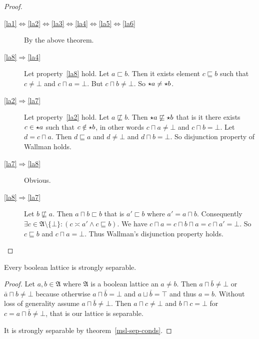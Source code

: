 \begin{proof}
~
\begin{description}
\item [{\ref{la1}$\Leftrightarrow$\ref{la2}$\Leftrightarrow$\ref{la3}$\Leftrightarrow$\ref{la4}$\Leftrightarrow$\ref{la5}$\Leftrightarrow$\ref{la6}}] By
the above theorem.
\item [{\ref{la8}$\Rightarrow$\ref{la4}}] Let property~\ref{la8} hold.
Let $a\sqsubset b$. Then it exists element $c\sqsubseteq b$ such
that $c\neq\bot$ and $c\sqcap a=\bot$. But $c\sqcap b\neq\bot$.
So $\star a\neq\star b$.
\item [{\ref{la2}$\Rightarrow$\ref{la7}}] Let property~\ref{la2} hold.
Let $a\nsqsubseteq b$. Then $\star a\not\sqsubseteq\star b$
that is it there exists $c\in\star a$ such that $c\notin\star b$,
in other words $c\sqcap a\neq\bot$ and $c\sqcap b=\bot$. Let $d=c\sqcap a$.
Then $d\sqsubseteq a$ and $d\neq\bot$ and $d\sqcap b=\bot$. So
disjunction property of Wallman holds.
\item [{\ref{la7}$\Rightarrow$\ref{la8}}] Obvious.
\item [{\ref{la8}$\Rightarrow$\ref{la7}}] Let $b\nsqsubseteq a$. Then
$a\sqcap b\sqsubset b$ that is $a'\sqsubset b$ where $a'=a\sqcap b$.
Consequently $\exists c\in\mathfrak{A}\setminus\{\bot\}:(c\asymp a'\land c\sqsubseteq b)$.
We have $c\sqcap a=c\sqcap b\sqcap a=c\sqcap a'=\bot$. So $c\sqsubseteq b$
and $c\sqcap a=\bot$. Thus Wallman's disjunction property holds.
\end{description}
\end{proof}
\begin{prop}
Every boolean lattice is strongly separable.\end{prop}
\begin{proof}
Let $a,b\in\mathfrak{A}$ where $\mathfrak{A}$ is a boolean lattice
an $a\neq b$. Then $a\sqcap\bar{b}\neq\bot$ or $\bar{a}\sqcap b\neq\bot$
because otherwise $a\sqcap\bar{b}=\bot$ and $a\sqcup\bar{b}=\top$
and thus $a=b$. Without loss of generality assume $a\sqcap\bar{b}\neq\bot$.
Then $a\sqcap c\neq\bot$ and $b\sqcap c=\bot$ for $c=a\sqcap\bar{b}\neq\bot$,
that is our lattice is separable.

It is strongly separable by theorem~\ref{msl-sep-conds}.
\end{proof}

